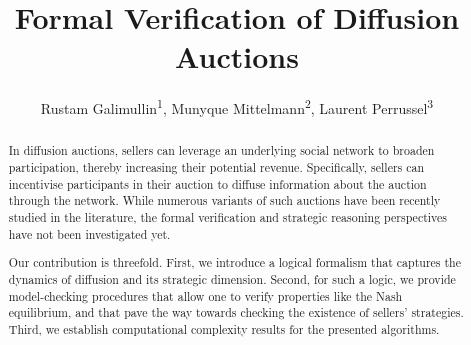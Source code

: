 \documentclass[letterpaper]{article} %
\title{Formal Verification of Diffusion Auctions%
}
\author{ 
   Rustam Galimullin\textsuperscript{\rm 1}, Munyque Mittelmann\textsuperscript{\rm 2},  Laurent Perrussel\textsuperscript{\rm 3}
}
\theoremstyle{definition}
\newcommand{\laurent}[1]{{[\color{purple}#1]}}
\begin{document}
\maketitle

\begin{abstract}

In diffusion auctions, sellers can leverage an underlying social network to broaden participation, thereby increasing their potential revenue. %
Specifically, sellers can incentivise participants in their auction to diffuse information about the auction through the network. While numerous variants of such auctions have been recently studied in the literature, the formal verification and strategic reasoning perspectives have not been investigated yet.   

Our contribution is threefold. First, we introduce a logical formalism that captures the dynamics of diffusion and its strategic dimension. Second, for such a logic, we provide model-checking procedures that allow one to verify properties like the Nash equilibrium, and that pave the way towards checking the existence of sellers' strategies. Third, we establish computational complexity results for the presented algorithms. %
\end{abstract}
\end{document}
